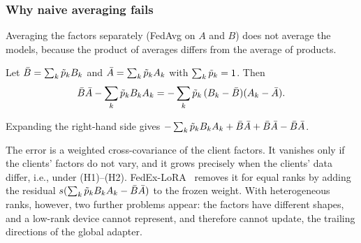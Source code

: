 \subsubsection{Why naive averaging fails}
Averaging the factors separately (FedAvg on $A$ and $B$) does not average the models, because
the product of averages differs from the average of products.

\begin{lemma}\label{lem:naive}
Let $\bar{B}=\sum_k\tilde{p}_kB_k$ and $\bar{A}=\sum_k\tilde{p}_kA_k$ with $\sum_k\tilde{p}_k=1$. Then
\begin{equation}\label{eq:naive-bias}
  \bar{B}\bar{A}-\sum_k\tilde{p}_k B_kA_k=-\sum_k\tilde{p}_k\,(B_k-\bar{B})(A_k-\bar{A}).
\end{equation}
\end{lemma}
\begin{IEEEproof}
Expanding the right-hand side gives
$-\sum_k\tilde{p}_kB_kA_k+\bar{B}\bar{A}+\bar{B}\bar{A}-\bar{B}\bar{A}$.
\end{IEEEproof}
The error is a weighted cross-covariance of the client factors. It vanishes only if the clients'
factors do not vary, and it grows precisely when the clients' data differ, i.e., under (H1)--(H2).
FedEx-LoRA~\cite{singhal2025fedex} removes it for equal ranks by adding the residual
$s(\sum_k\tilde{p}_kB_kA_k-\bar{B}\bar{A})$ to the frozen weight. With heterogeneous ranks, however,
two further problems appear: the factors have different shapes, and a low-rank device cannot
represent, and therefore cannot update, the trailing directions of the global adapter.

